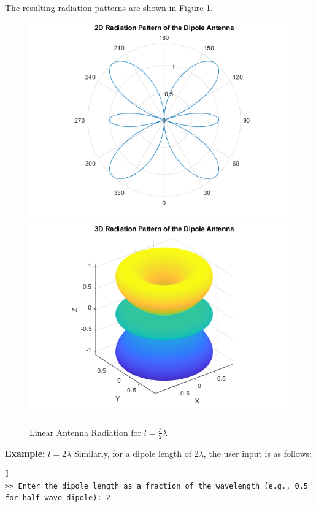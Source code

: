 \documentclass[a4paper, 12pt, english]{article}
\begin{document}
The resulting radiation patterns are shown in Figure \ref{fig:Linear Antenna Radiation 3/2}.
\begin{figure}[H]
    \centering
         \includegraphics[width=0.49\linewidth]{report/images/linear_antenna_2D.png}
         \hfill
         \includegraphics[width=0.49\linewidth]{report/images/linear_antenna_3D.png}
         \caption{Linear Antenna Radiation for $ {l} = {\frac{3}{2}}{\lambda} $}
         \label{fig:Linear Antenna Radiation 3/2}
\end{figure}

\noindent
\textbf{Example:} $ {l} = {2}{\lambda} $
\newline
Similarly, for a dipole length of $ {2}{\lambda} $, the user input is as follows:
\begin{lstlisting}[style=commandstyle,caption=Command line output]]
>> Enter the dipole length as a fraction of the wavelength (e.g., 0.5 for half-wave dipole): 2
\end{lstlisting}
\end{document}
